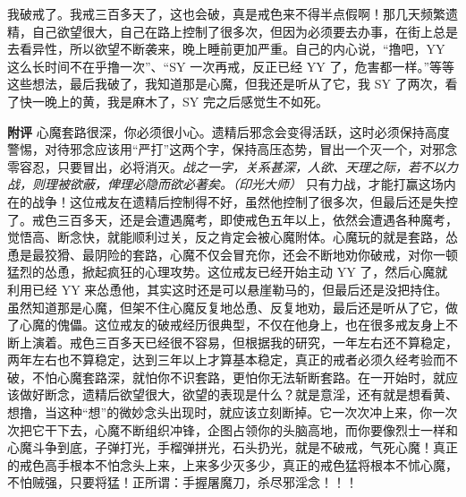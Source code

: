 \begin{case}
    我破戒了。我戒三百多天了，这也会破，真是戒色来不得半点假啊！那几天频繁遗精，自己欲望很大，自己在路上控制了很多次，但因为必须要去办事，在街上总是去看异性，所以欲望不断袭来，晚上睡前更加严重。自己的内心说，“撸吧，YY 这么长时间不在乎撸一次”、“SY 一次再戒，反正已经 YY 了，危害都一样。”等等这些想法，最后我破了，我知道那是心魔，但我还是听从了它，我 SY 了两次，看了快一晚上的黄，我是麻木了，SY 完之后感觉生不如死。

    \textbf{附评} 心魔套路很深，你必须很小心。遗精后邪念会变得活跃，这时必须保持高度警惕，对待邪念应该用“严打”这两个字，保持高压态势，冒出一个灭一个，对邪念零容忍，只要冒出，必将消灭。\textit{战之一字，关系甚深，人欲、天理之际，若不以力战，则理被欲蔽，俾理必隐而欲必著矣。（印光大师）} 只有力战，才能打赢这场内在的战争！这位戒友在遗精后控制得不好，虽然他控制了很多次，但最后还是失控了。戒色三百多天，还是会遭遇魔考，即使戒色五年以上，依然会遭遇各种魔考，觉悟高、断念快，就能顺利过关，反之肯定会被心魔附体。心魔玩的就是套路，怂恿是最狡猾、最阴险的套路，心魔不仅会冒充你，还会不断地劝你破戒，对你一顿猛烈的怂恿，掀起疯狂的心理攻势。这位戒友已经开始主动 YY 了，然后心魔就利用已经 YY 来怂恿他，其实这时还是可以悬崖勒马的，但最后还是没把持住。虽然知道那是心魔，但架不住心魔反复地怂恿、反复地劝，最后还是听从了它，做了心魔的傀儡。这位戒友的破戒经历很典型，不仅在他身上，也在很多戒友身上不断上演着。戒色三百多天已经很不容易，但根据我的研究，一年左右还不算稳定，两年左右也不算稳定，达到三年以上才算基本稳定，真正的戒者必须久经考验而不破，不怕心魔套路深，就怕你不识套路，更怕你无法斩断套路。在一开始时，就应该做好断念，遗精后欲望很大，欲望的表现是什么？就是意淫，还有就是想看黄、想撸，当这种“想”的微妙念头出现时，就应该立刻断掉。它一次次冲上来，你一次次把它干下去，心魔不断组织冲锋，企图占领你的头脑高地，而你要像烈士一样和心魔斗争到底，子弹打光，手榴弹拼光，石头扔光，就是不破戒，气死心魔！真正的戒色高手根本不怕念头上来，上来多少灭多少，真正的戒色猛将根本不怵心魔，不怕贼强，只要将猛！正所谓：手握屠魔刀，杀尽邪淫念！！！
\end{case}

